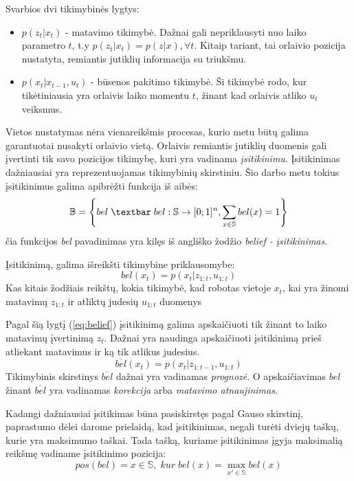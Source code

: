 \documentclass[a4paper,12pt]{article}
\begin{document}
		Svarbios dvi tikimybinės lygtys:
		\begin{itemize}
			\item $p(z_t|x_t)$ - matavimo tikimybė. Dažnai gali nepriklausyti nuo laiko parametro $t$, t.y $p(z_t|x_t) = p(z|x), \forall t$. Kitaip tariant, tai orlaivio pozicija nustatyta, remiantis jutiklių informacija su triukšmu.
			\item $p(x_t|x_{t-1},u_t)$ - būsenos pakitimo tikimybė. Ši tikimybė rodo, kur tikėtiniausia yra orlaivis laiko momentu $t$, žinant kad orlaivis atliko $u_t$ veiksmus.
		\end{itemize}	
			
		Vietos nustatymas nėra vienareikšmis procesas, kurio metu būtų galima garantuotai nusakyti orlaivio vietą. Orlaivis remiantis jutiklių duomenis gali įvertinti tik savo pozicijos tikimybę, kuri yra vadinama \textit{įsitikinimu}. Įsitikinimas dažniausiai yra reprezentuojamas tikimybinių skirstiniu. Šio darbo metu tokius įsitikinimus galima apibrėžti funkcija iš aibės:
		\begin{equation}
			\mathbb{B} = \left\{bel \;\textbar\; bel: \mathbb{S} \rightarrow [0;1]^n, \sum_{x \in \mathbb{S}}bel(x) = 1 \right\}
		\end{equation}
		čia funkcijos \textit{bel} pavadinimas yra kilęs iš angliško žodžio \textit{belief - įsitikinimas}. 
		
		Įsitikinimą, galima išreikšti tikimybine priklausomybe:	
		\begin{equation}
			bel(x_t) = p(x_t | z_{1:t}, u_{1:t})
			\label{eq:belief}
		\end{equation}
		Kas kitais žodžiais reikštų, kokia tikimybė, kad robotas vietoje $x_t$, kai yra žinomi matavimų $z_{1:t}$ ir atliktų judesių $u_{1:t}$ duomenys
		
		Pagal šią lygtį (\ref{eq:belief}) įsitikinimą galima apskaičiuoti tik žinant  to laiko matavimų įvertinimą $z_t$. Dažnai yra naudinga apskaičiuoti įsitikinimą prieš atliekant matavimus ir ką tik atlikus judesius. 
		\begin{equation}
			\overline{bel}(x_t) = p(x_t | z_{1:t-1}, u_{1:t})
		\end{equation}
		Tikimybinis skirstinys $\overline{bel}$ dažnai yra vadinamas \textit{prognozė}. O apskaičiavimas $bel$ žinant $\overline{bel}$ yra vadinamas \textit{korekcija} arba  \textit{matavimo atnaujinimas}. 
			
		Kadangi dažniausiai įsitikimas būna pasiskirstęs pagal Gauso skirstinį, paprastumo dėlei darome prielaidą, kad įsitikinimas, negali turėti dviejų taškų, kurie yra maksimumo taškai. 
		Tada tašką, kuriame įsitikinimas įgyja maksimalią reikšmę vadiname įsitikinimo pozicija:
		\begin{equation}
			pos(bel) = x \in \mathbb{S}, \; kur \; bel(x) = \max_{x' \in \mathbb{S}}{bel(x)}
		\end{equation}
		
\end{document}
